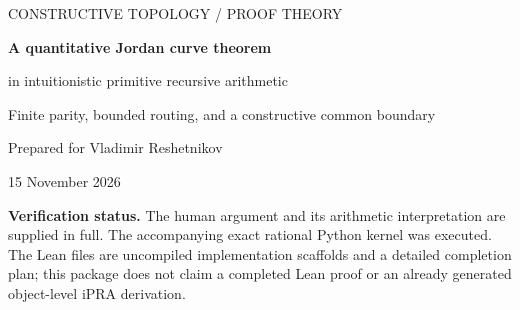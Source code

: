 \documentclass[11pt]{article}
\theoremstyle{definition}
\begin{document}
\begin{titlepage}
\vspace*{12mm}
{\large\color{accent}CONSTRUCTIVE TOPOLOGY / PROOF THEORY\par}
\vspace{9mm}
{\huge\bfseries\color{ink}A quantitative Jordan curve theorem\par}
\vspace{4mm}
{\LARGE in intuitionistic primitive recursive arithmetic\par}
\vspace{8mm}
{\large Finite parity, bounded routing, and a constructive common boundary\par}
\vspace{13mm}
{\large Prepared for Vladimir Reshetnikov\par}
{15 November 2026\par}
\vspace{10mm}
\begin{abstract}
We give a complete constructive proof of a quantitative Jordan curve theorem
for a circle embedding supplied by primitive recursive rational names, a
forward continuity modulus, and a positive inverse separation modulus.
For every point with certified positive distance from the curve, a finite
calculation returns its inside/outside bit. Equal bits yield a polygonal
connecting path with an explicit positive clearance. Both bits occur
arbitrarily near every curve point, with primitive recursive witnesses.
Every uniformly continuous path between different bits has approximate
intersections with the curve at every requested precision.

The proof uses rational arithmetic and crossing parity, not analytic winding
numbers. A bounded honeycomb search either finds a route or constructs a
boundary cycle whose parity factors through the original parameter circle.
A finite square-coloring argument supplies both sides. All search bounds
and the quantifier-free induction discipline are made explicit.
The first-order conclusion is a schema for fixed primitive recursive
presentations, not a quantification over arbitrary real functions.
\end{abstract}
\vfill
\colorbox{pale}{\parbox{\dimexpr\textwidth-2\fboxsep\relax}{
\textbf{Verification status.}
The human argument and its arithmetic interpretation are supplied in full.
The accompanying exact rational Python kernel was executed.
The Lean files are uncompiled implementation scaffolds and a detailed
completion plan; this package does not claim a completed Lean proof or an
already generated object-level iPRA derivation.}}
\end{titlepage}
\end{document}
